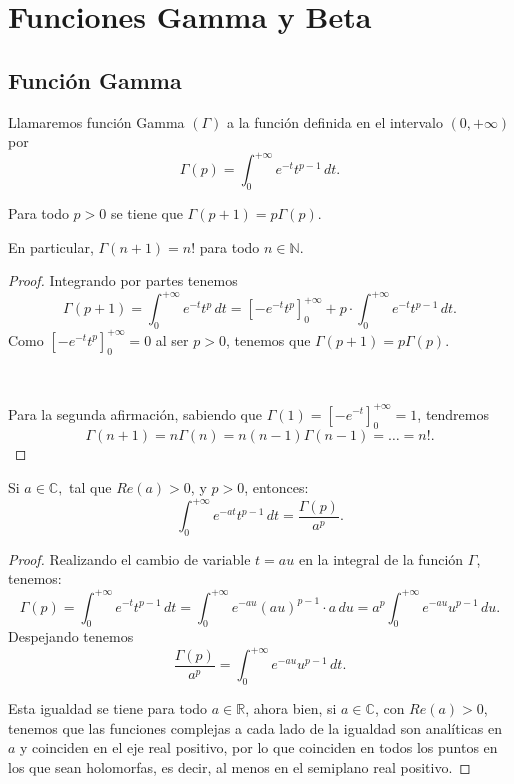 \chapter{Funciones Gamma y Beta}
\label{ap:apendice1}
\justifying
\section{Función Gamma}
\begin{definition}
    Llamaremos función Gamma $(\Gamma)$ \index{$(\Gamma)$ }a la
    función definida en el intervalo $(0,+\infty)$ por
    \begin{equation}
        \Gamma(p)=\int_{0}^{+\infty}e^{-t}t^{p-1}\,dt.
    \end{equation}
\end{definition}


\begin{theorem}
    Para todo $p>0$ se tiene que $\Gamma(p+1)=p\Gamma(p)$.
    
    En particular, $\Gamma(n+1)=n!$ para todo $n\in\mathbb{N}$.
\end{theorem}

\begin{proof}
    Integrando por partes tenemos
    \[
        \Gamma(p+1)=\int_{0}^{+\infty}e^{-t}t^{p}\,dt
        =\left[-e^{-t}t^{p}\right]_{0}^{+\infty}
        +p\cdot\int_{0}^{+\infty}e^{-t}t^{p-1}\,dt.
    \]
    Como $\left[-e^{-t}t^{p}\right]_{0}^{+\infty}=0$ al ser
    $p > 0$, tenemos que $\Gamma(p+1) = p\Gamma(p)$.

    \

    Para la segunda afirmación, sabiendo que $\Gamma(1) = \left[
    -e^{-t}\right]_0^{+\infty}=1$, tendremos
    \[
        \Gamma(n+1)=n\Gamma(n)=n(n-1)\Gamma(n-1)=\dots=n!.
    \]   
\end{proof}

\begin{theorem}
    \label{thm:gamma}
    Si $a\in\mathbb{C},$ tal que $Re(a)>0$, y $p>0$, entonces:
    \[
        \int_{0}^{+\infty}e^{-at}t^{p-1}\,dt=\frac{\Gamma(p)}{a^{p}}.
    \]
\end{theorem}

\begin{proof}
    Realizando el cambio de variable $t = au$ en la integral
    de la función $\Gamma$, tenemos:
    \[
        \Gamma(p)=\int_{0}^{+\infty}e^{-t}t^{p-1}\,dt=
        \int_{0}^{+\infty}e^{-au}(au)^{p-1}\cdot a\,du=
        a^{p}\int_{0}^{+\infty}e^{-au}u^{p-1}\,du.
    \]
    Despejando tenemos
    \[
        \frac{\Gamma(p)}{a^{p}}=\int_{0}^{+\infty}e^{-au}u^{p-1}\,dt.
    \]

    Esta igualdad se tiene para todo $a\in\mathbb{R}$, ahora bien, si
    $a\in\mathbb{C}$, con $Re(a)>0$, tenemos que las funciones
    complejas a cada lado de la igualdad son analíticas en $a$
    y coinciden en el eje real positivo, por lo que coinciden en todos
    los puntos en los que sean holomorfas, es decir, al menos en el
    semiplano real positivo.
\end{proof}

